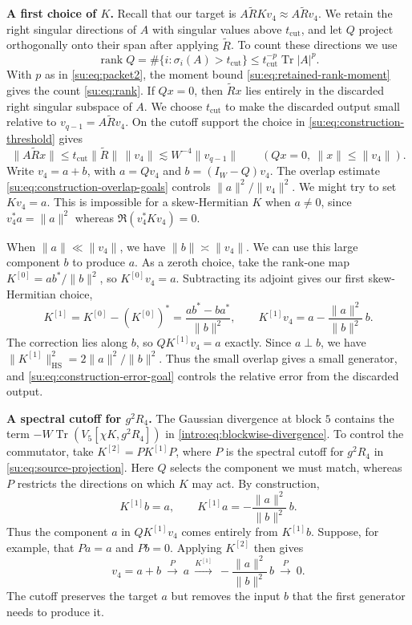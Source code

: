 \documentclass[11pt]{article}
\numberwithin{equation}{section}
\theoremstyle{remark}
\newcommand{\Tr}{\operatorname{Tr}}
\newcommand{\rank}{\operatorname{rank}}
\newcommand{\HS}{\mathrm{HS}}
\begin{document}
\textbf{A first choice of $K$.}
Recall that our target is $A\widetilde R K v_4\approx A\widetilde R v_4$.
We retain the right singular directions of $A$ with singular values
above $t_{\mathrm{cut}}$, and let $Q$ project orthogonally onto their
span after applying $\widetilde R$. To count these directions we use
\[
 \rank Q=\#\{i:\sigma_i(A)>t_{\mathrm{cut}}\}
 \le t_{\mathrm{cut}}^{-p}\Tr|A|^p .
\]
With $p$ as in \eqref{su:eq:packet2}, the moment bound
\eqref{su:eq:retained-rank-moment} gives the count \eqref{su:eq:rank}.
If $Qx=0$, then $\widetilde R x$
lies entirely in the discarded right singular subspace of $A$.
We choose $t_{\mathrm{cut}}$ to make the discarded output small
relative to $v_{q-1}=A\widetilde Rv_4$. On the cutoff support the
choice in \eqref{su:eq:construction-threshold} gives
\[
 \|A\widetilde R x\|\le t_{\mathrm{cut}}\|\widetilde R\|\,\|v_4\|
 \lesssim W^{-4}\|v_{q-1}\|
 \qquad (Qx=0,\ \|x\|\le\|v_4\|).
\]
Write $v_4=a+b$, with $a=Qv_4$
and $b=(I_W-Q)v_4$. The overlap estimate
\eqref{su:eq:construction-overlap-goals} controls $\|a\|^2/\|v_4\|^2$.
We might try to set
$Kv_4=a$. This is impossible for a skew-Hermitian $K$ when $a\ne0$,
since $v_4^*a=\|a\|^2$ whereas $\Re(v_4^*Kv_4)=0$.

When $\|a\|\ll\|v_4\|$, we have $\|b\|\asymp\|v_4\|$. We can
use this large component $b$ to produce $a$. As a zeroth choice, take
the rank-one map $K^{[0]}=ab^*/\|b\|^2$, so $K^{[0]}v_4=a$.
Subtracting its adjoint gives our first skew-Hermitian choice,
\[
 K^{[1]}=K^{[0]}-(K^{[0]})^*=\frac{ab^*-ba^*}{\|b\|^2},\qquad
 K^{[1]}v_4=a-\frac{\|a\|^2}{\|b\|^2}\,b .
\]
The correction lies along $b$, so $QK^{[1]}v_4=a$ exactly.
Since $a\perp b$, we have
$\|K^{[1]}\|_{\HS}^2=2\|a\|^2/\|b\|^2$.
Thus the small overlap gives a small generator, and
\eqref{su:eq:construction-error-goal} controls the relative error
from the discarded output.

\textbf{A spectral cutoff for $g^2R_4$.}
The Gaussian divergence at block $5$ contains the term
$-W\Tr(V_5[\chi K,g^2R_4])$ in \eqref{intro:eq:blockwise-divergence}.
To control the commutator, take $K^{[2]}=PK^{[1]}P$,
where $P$ is the spectral cutoff for $g^2R_4$ in \eqref{su:eq:source-projection}.
Here $Q$ selects the component we must match, whereas $P$ restricts
the directions on which $K$ may act. By construction,
\[
 K^{[1]}b=a,\qquad K^{[1]}a=-\frac{\|a\|^2}{\|b\|^2}\,b.
\]
Thus the component $a$ in $QK^{[1]}v_4$ comes entirely from
$K^{[1]}b$. Suppose, for example, that $Pa=a$ and $Pb=0$.
Applying $K^{[2]}$ then gives
\[
 v_4=a+b \ \xrightarrow{P}\ a
 \ \xrightarrow{K^{[1]}}\ -\frac{\|a\|^2}{\|b\|^2}\,b
 \ \xrightarrow{P}\ 0 .
\]
The cutoff preserves the target $a$ but removes the input $b$ that
the first generator needs to produce it.
\end{document}
